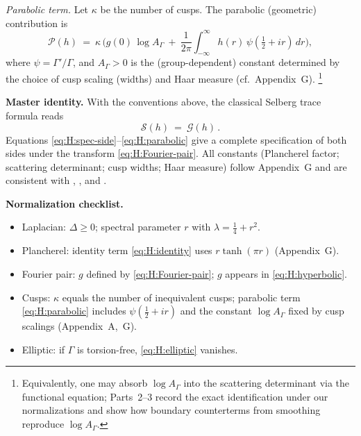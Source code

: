 \medskip
\emph{Parabolic term.}
Let $\kappa$ be the number of cusps. The parabolic (geometric) contribution is
\begin{equation}\label{eq:H:parabolic}
\mathcal P(h)\ =\ \kappa\,\Big( g(0)\,\log A_\Gamma\ +\ \frac{1}{2\pi}\int_{-\infty}^{\infty}
h(r)\,\psi\!\left(\tfrac12+ir\right)\,dr\Big),
\end{equation}
where $\psi=\Gamma'/\Gamma$, and $A_\Gamma>0$ is the (group-dependent) constant determined by the
choice of cusp scaling (widths) and Haar measure (cf.\ Appendix~G).%
\footnote{Equivalently, one may absorb $\log A_\Gamma$ into the scattering determinant via the functional
equation; Parts~2–3 record the exact identification under our normalizations and show how boundary counterterms
from smoothing reproduce $\log A_\Gamma$.}

\medskip
\noindent\textbf{Master identity.}
With the conventions above, the classical Selberg trace formula reads
\begin{equation}\label{eq:H:Selberg-master}
\boxed{\quad
\mathcal S(h)\ =\ \mathcal G(h)\,.
\quad}
\end{equation}
Equations \eqref{eq:H:spec-side}–\eqref{eq:H:parabolic} give a complete specification of both sides
under the transform \eqref{eq:H:Fourier-pair}. All constants (Plancherel factor; scattering determinant;
cusp widths; Haar measure) follow Appendix~G and are consistent with
\cite[Ch.~11]{Iwaniec2002}, \cite[Ch.~7]{Hejhal1983}, and \cite[Ch.~IV]{Helgason}.

\medskip
\noindent\textbf{Normalization checklist.}
\begin{itemize}
  \item Laplacian: $\Delta\ge 0$; spectral parameter $r$ with $\lambda=\tfrac14+r^2$.
  \item Plancherel: identity term \eqref{eq:H:identity} uses $r\tanh(\pi r)$ (Appendix~G).
  \item Fourier pair: $g$ defined by \eqref{eq:H:Fourier-pair}; $g$ appears in \eqref{eq:H:hyperbolic}.
  \item Cusps: $\kappa$ equals the number of inequivalent cusps; parabolic term \eqref{eq:H:parabolic}
        includes $\psi(\tfrac12+ir)$ and the constant $\log A_\Gamma$ fixed by cusp scalings (Appendix~A,~G).
  \item Elliptic: if $\Gamma$ is torsion-free, \eqref{eq:H:elliptic} vanishes.
\end{itemize}

